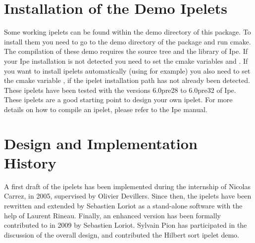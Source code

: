 \section{Installation of the Demo Ipelets}
Some working ipelets can be found within
the demo directory of this package. To install them you need
to go to the demo directory of the package and run cmake.
The compilation of these demo requires the source tree and the library of Ipe.
If your Ipe installation is not detected you need to set the cmake
variables  and . If you want
to install ipelets automatically (using  for example)
you also need to set the cmake variable , 
if the ipelet installation path has not already been detected.
These ipelets have been tested with the versions 6.0pre28 to 6.0pre32 of Ipe.
These ipelets are a good starting point to design your own ipelet. For more details on how
to compile an ipelet, please refer to the Ipe manual.



\section{Design and Implementation History}
A first draft of the \cgal{} ipelets has been implemented during the
internship of Nicolas Carrez, in 2005, supervised by Olivier Devillers.
Since then, the ipelets have been rewritten and extended by Sebastien
Loriot as a stand-alone software with the help of Laurent Rineau.
Finally, an enhanced version has been formally contributed to \cgal{} in 2009
by Sebastien Loriot. Sylvain Pion has participated in the discussion
of the overall design, and contributed the Hilbert sort ipelet demo.
